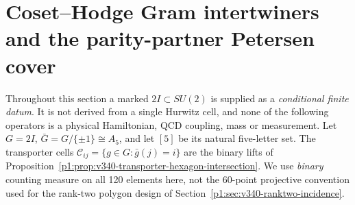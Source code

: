 \documentclass[11pt]{article}
\begin{document}
\section{Coset--Hodge Gram intertwiners and the parity-partner Petersen cover}
\label{p1:sec:v341-coset-hodge-desargues}
Throughout this section a marked $2I\subset SU(2)$ is supplied as a
\emph{conditional finite datum}.  It is not derived from a single
Hurwitz cell, and none of the following operators is a physical
Hamiltonian, QCD coupling, mass or measurement.  Let
$G=2I$, $\bar G=G/\{\pm1\}\cong A_5$, and let $[5]$ be its
natural five-letter set.  The transporter cells
$\mathcal C_{ij}=\{g\in G:\bar g(j)=i\}$ are the binary lifts
of Proposition~\ref{p1:prop:v340-transporter-hexagon-intersection}.
We use \emph{binary} counting measure on all 120 elements here, not
the 60-point projective convention used for the rank-two polygon
design of Section~\ref{p1:sec:v340-ranktwo-incidence}.
\end{document}
